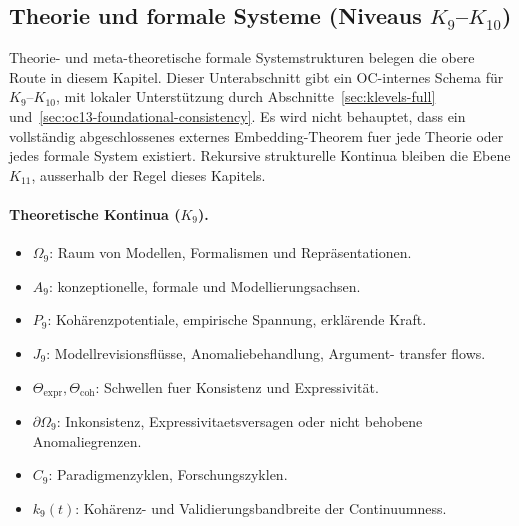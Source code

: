 \subsection{Theorie und formale Systeme (Niveaus \texorpdfstring{$K_9$}{K9}--\texorpdfstring{$K_{10}$}{K10})}

Theorie- und meta-theoretische formale Systemstrukturen belegen die obere Route in
diesem Kapitel. Dieser Unterabschnitt gibt ein OC-internes Schema für
\(K_9\)--\(K_{10}\), mit lokaler Unterstützung durch
Abschnitte~\ref{sec:klevels-full} und~\ref{sec:oc13-foundational-consistency}.
Es wird nicht behauptet, dass ein vollständig abgeschlossenes externes
Embedding-Theorem fuer jede Theorie oder jedes formale System existiert. Rekursive
strukturelle Kontinua bleiben die Ebene \(K_{11}\), ausserhalb der Regel dieses
Kapitels.

\paragraph{Theoretische Kontinua (\texorpdfstring{\(K_9\)}{K9}).}
\begin{itemize}
  \item \(\Omega_9\): Raum von Modellen, Formalismen und Repräsentationen.
  \item \(A_9\): konzeptionelle, formale und Modellierungsachsen.
  \item \(P_9\): Kohärenzpotentiale, empirische Spannung, erklärende
        Kraft.
  \item \(J_9\): Modellrevisionsflüsse, Anomaliebehandlung, Argument-
        transfer flows.
  \item \(\Theta_{\mathrm{expr}}, \Theta_{\mathrm{coh}}\): Schwellen fuer
        Konsistenz und Expressivität.
  \item \(\partial\Omega_9\): Inkonsistenz, Expressivitaetsversagen oder
        nicht behobene Anomaliegrenzen.
  \item \(C_9\): Paradigmenzyklen, Forschungszyklen.
  \item \(k_9(t)\): Kohärenz- und Validierungsbandbreite der Continuumness.
\end{itemize}

